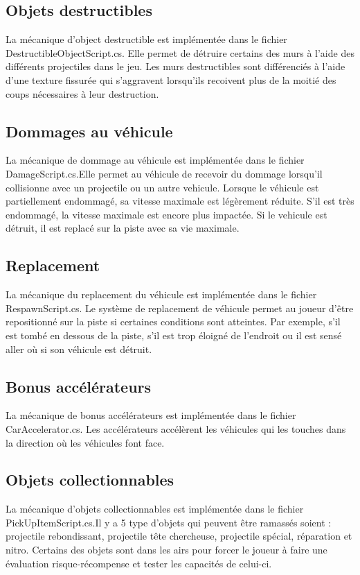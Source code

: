 \documentclass[a4paper, 12pt]{article} %
\begin{document}
\subsection{Objets destructibles}
La mécanique d'object destructible est implémentée dans le fichier DestructibleObjectScript.cs. Elle permet de détruire certains des murs à l'aide des différents projectiles dans le jeu. Les murs destructibles sont différenciés à l'aide d'une texture fissurée qui s'aggravent lorsqu'ils recoivent plus de la moitié des coups nécessaires à leur destruction.
\subsection{Dommages au véhicule}
La mécanique de dommage au véhicule est implémentée dans le fichier DamageScript.cs.Elle permet au véhicule de recevoir du dommage lorsqu'il collisionne avec un projectile ou un autre vehicule. Lorsque le véhicule est partiellement endommagé, sa vitesse maximale est légèrement réduite. S'il est très endommagé, la vitesse maximale est encore plus impactée. Si le vehicule est détruit, il est replacé sur la piste avec sa vie maximale.
\subsection{Replacement}
La mécanique du replacement du véhicule est implémentée dans le fichier RespawnScript.cs. Le système de replacement de véhicule permet au joueur d'être repositionné sur la piste si certaines conditions sont atteintes. Par exemple, s'il est tombé en dessous de la piste, s'il est trop éloigné de l'endroit ou il est sensé aller où si son véhicule est détruit.
\subsection{Bonus accélérateurs}
La mécanique de bonus accélérateurs est implémentée dans le fichier CarAccelerator.cs. Les accélérateurs accélèrent les véhicules qui les touches dans la direction où les véhicules font face.
\subsection{Objets collectionnables}
La mécanique d'objets collectionnables est implémentée dans le fichier PickUpItemScript.cs.Il y a 5 type d'objets qui peuvent être ramassés soient : projectile rebondissant, projectile tête chercheuse, projectile spécial, réparation et nitro. Certains des objets sont dans les airs pour forcer le joueur à faire une évaluation risque-récompense et tester les capacités de celui-ci.
\end{document}
